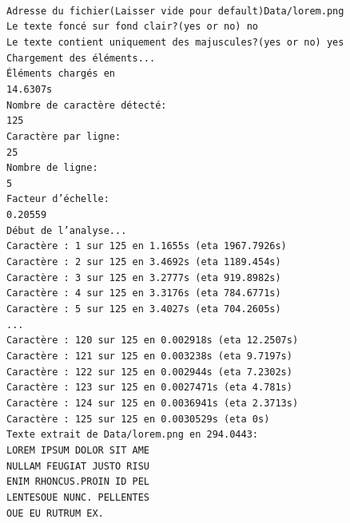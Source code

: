 \documentclass[a4paper,12pt,titlepage]{report}
\begin{document}
	\texttt{\\
	Adresse du fichier(Laisser vide pour default)Data/lorem.png\\
Le texte foncé sur fond clair?(yes or no) no\\
Le texte contient uniquement des majuscules?(yes or no) yes\\
Chargement des éléments...\\
Éléments chargés en \\
14.6307s\\
Nombre de caractère détecté:\\
 125\\
Caractère par ligne:\\
 25\\
Nombre de ligne:\\
 5\\
Facteur d'échelle:\\
 0.20559\\
Début de l'analyse...\\
Caractère : 1 sur 125 en 1.1655s (eta 1967.7926s)\\
Caractère : 2 sur 125 en 3.4692s (eta 1189.454s)\\
Caractère : 3 sur 125 en 3.2777s (eta 919.8982s)\\
Caractère : 4 sur 125 en 3.3176s (eta 784.6771s)\\
Caractère : 5 sur 125 en 3.4027s (eta 704.2605s)\\
	...\\
Caractère : 120 sur 125 en 0.002918s (eta 12.2507s)\\
Caractère : 121 sur 125 en 0.003238s (eta 9.7197s)\\
Caractère : 122 sur 125 en 0.002944s (eta 7.2302s)\\
Caractère : 123 sur 125 en 0.0027471s (eta 4.781s)\\
Caractère : 124 sur 125 en 0.0036941s (eta 2.3713s)\\
Caractère : 125 sur 125 en 0.0030529s (eta 0s)\\
Texte extrait de Data/lorem.png en 294.0443:\\
LOREM IPSUM DOLOR SIT AME\\
NULLAM FEUGIAT JUSTO RISU\\
ENIM RHONCUS.PROIN ID PEL\\
LENTESOUE NUNC. PELLENTES\\
OUE EU RUTRUM EX.\\}
\end{document}

